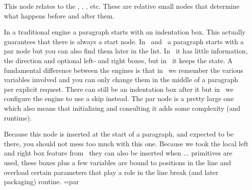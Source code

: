 

\stopsubsection

\startsubsection[title={boundary}]

This node relates to the \type {\noboundary}, \type {\boundary}, \type
{\protrusionboundary}, \type {\wordboundary} etc. These are relative small nodes
that determine what happens before and after them.



\stopsubsection

\startsubsection[title={par}]

In a traditional engine a paragraph starts with an indentation box. This actually
guarantees that there is always a start node. In \LUATEX\ and \LUAMETATEX\ a
paragraph starts with a par node but you can also find them later in the list. In
\LUATEX\ it has little information, the direction and optional left- and right
boxes, but in \LUAMETATEX\ it keeps the state. A fundamental difference between
the engines is that in \LUAMETATEX\ we remember the various variables involved
and you can only change them in the middle of a paragraph per explicit request.
There can still be an indentation box after it but in \CONTEXT\ we configure the
engine to use a skip instead. The par node is a pretty large one which also means that
initializing and consulting it adds some complexity (and runtime).

Because this node is inserted at the start of a paragraph, and expected to be
there, you should not mess too much with this one. Because we took the local left
and right box feature from \OMEGA\ they can also be inserted when \type
{\local...} primitives are used, these boxes plus a few variables are bound to
positions in the line and overload certain parameters that play a role in the
line break (and later packaging) routine. ={par}



